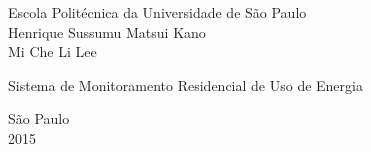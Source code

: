 \begin{titlepage}

\begin{center}
\vspace{30mm}
\large
Escola Politécnica da Universidade de São Paulo\\
Henrique Sussumu Matsui Kano\\
Mi Che Li Lee

\vspace{90mm}
\Large
Sistema de Monitoramento Residencial de Uso de Energia

\vfill
São Paulo\\
2015

\end{center}

\end{titlepage}
